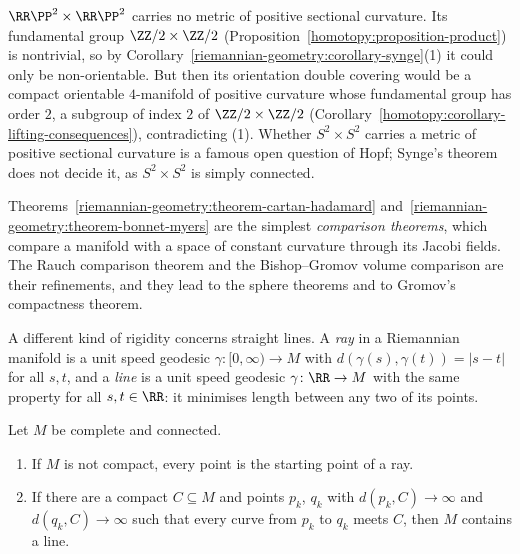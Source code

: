 \begin{example}\label{riemannian-geometry:example-synge}
$\RR\PP^2 \times \RR\PP^2$ carries no metric of positive sectional curvature. Its fundamental group $\ZZ/2 \times \ZZ/2$ (Proposition~\ref{homotopy:proposition-product}) is
nontrivial, so by Corollary~\ref{riemannian-geometry:corollary-synge}(1) it could only be non-orientable. But then its orientation double covering would be a compact
orientable $4$-manifold of positive curvature whose fundamental group has order $2$, a subgroup of index $2$ of $\ZZ/2 \times \ZZ/2$
(Corollary~\ref{homotopy:corollary-lifting-consequences}), contradicting (1). Whether $S^2 \times S^2$ carries a metric of positive sectional curvature is a famous open question
of Hopf; Synge's theorem does not decide it, as $S^2 \times S^2$ is simply connected.
\end{example}

\begin{remark}\label{riemannian-geometry:remark-comparison}
Theorems~\ref{riemannian-geometry:theorem-cartan-hadamard} and~\ref{riemannian-geometry:theorem-bonnet-myers} are the simplest \emph{comparison theorems}, which compare a manifold with a space of constant curvature
through its Jacobi fields. The Rauch comparison theorem \cite[Chapter 10]{do-carmo-riemannian} and the Bishop--Gromov volume comparison \cite{lee-riemannian} are their refinements, and they lead to the sphere theorems and to
Gromov's compactness theorem.
\end{remark}

A different kind of rigidity concerns straight lines. A \emph{ray} in a Riemannian manifold is a unit speed geodesic $\gamma \colon [0, \infty) \to M$ with
$d(\gamma(s), \gamma(t)) = |s - t|$ for all $s, t$, and a \emph{line} is a unit speed geodesic $\gamma \colon \RR \to M$ with the same property for all $s, t \in \RR$: it
minimises length between any two of its points.

\begin{proposition}\label{riemannian-geometry:proposition-rays-lines}
Let $M$ be complete and connected.
\begin{enumerate}
\item If $M$ is not compact, every point is the starting point of a ray.
\item If there are a compact $C \subseteq M$ and points $p_k$, $q_k$ with $d(p_k, C) \to \infty$ and $d(q_k, C) \to \infty$ such that every curve from $p_k$ to $q_k$ meets
$C$, then $M$ contains a line.
\end{enumerate}
\end{proposition}

